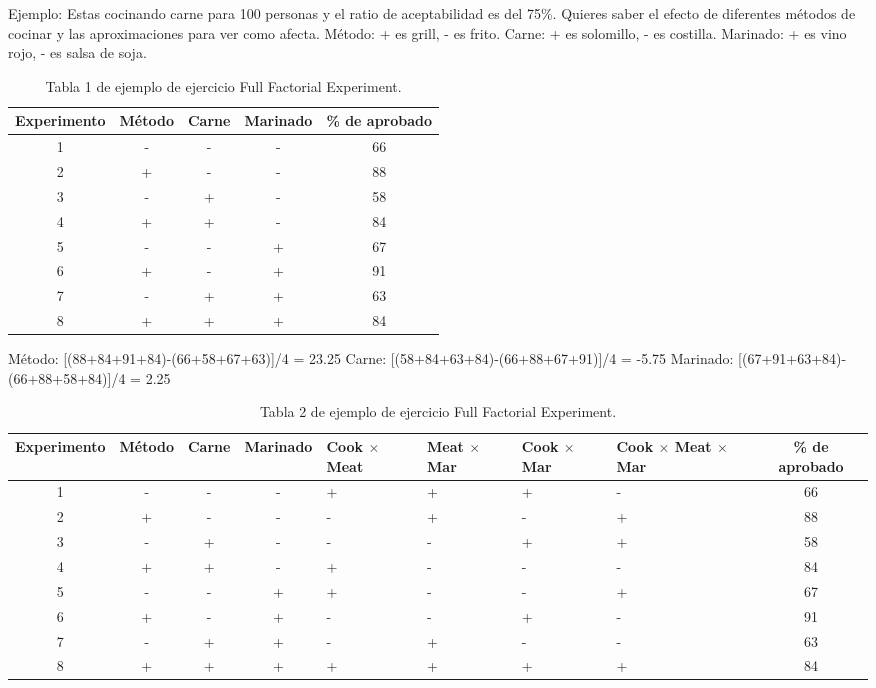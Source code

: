 \documentclass[oneside]{book}
\begin{document}
Ejemplo: Estas cocinando carne para 100 personas y el ratio de aceptabilidad es del 75\%. Quieres saber el efecto de diferentes métodos de cocinar y las aproximaciones para ver como afecta.
Método: + es grill, - es frito. Carne: + es solomillo, - es costilla. Marinado: + es vino rojo, - es salsa de soja.

\begin{table}[H]
	\begin{center}
\begin{tabular}{|c|c|c|c|c|}
	\hline Experimento & Método & Carne & Marinado & \% de aprobado \\ 
	\hline 1 & - & - & - & 66 \\ 
	\hline 2 & + & - & - & 88 \\ 
	\hline 3 & - & + & - & 58 \\ 
	\hline 4 & + & + & - & 84 \\ 
	\hline 5 & - & - & + & 67 \\ 
	\hline 6 & + & - & + & 91 \\ 
	\hline 7 & - & + & + & 63 \\ 
	\hline 8 & + & + & + & 84 \\ 
	\hline 
\end{tabular} 
		\caption{Tabla 1 de ejemplo de ejercicio Full Factorial Experiment.}
		\end{center}
\end{table}

Método: [(88+84+91+84)-(66+58+67+63)]/4 = 23.25 \newline
Carne: [(58+84+63+84)-(66+88+67+91)]/4 = -5.75 \newline
Marinado: [(67+91+63+84)-(66+88+58+84)]/4 = 2.25


\begin{table}[H]
	\begin{center}
		\begin{tabular}{|c|c|c|c|p{1.5cm}|p{1.5cm}|p{1.5cm}|p{1.8cm}|c|}
			\hline Experimento & Método & Carne & Marinado & Cook $\times$ Meat & Meat $\times$ Mar & Cook $\times$ Mar & Cook $\times$ Meat $\times$ Mar & \% de aprobado \\ 
			\hline 1 & - & - & - & + & + & + & - & 66 \\ 
			\hline 2 & + & - & - & - & + & - & + & 88 \\ 
			\hline 3 & - & + & - & - & - & + & + & 58 \\ 
			\hline 4 & + & + & - & + & - & - & - & 84 \\ 
			\hline 5 & - & - & + & + & - & - & + & 67 \\ 
			\hline 6 & + & - & + & - & - & + & - & 91 \\ 
			\hline 7 & - & + & + & - & + & - & - & 63 \\ 
			\hline 8 & + & + & + & + & + & + & + & 84 \\ 
			\hline 
		\end{tabular} 
		\caption{Tabla 2 de ejemplo de ejercicio Full Factorial Experiment.}
	\end{center}
\end{table}
\end{document}

